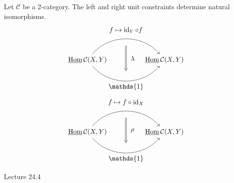 \begin{prop}
	Let $ \mathcal{ C } $ be a 2-category. 
	The left and right unit constraints determine natural isomorphisms.
	\[
	\begin{tikzcd}
		\twoHom{ \mathcal{ C } } ( X , Y )
		\arrow[bend left=50]{rr}[name=U',label=above:$ f \mapsto \id_Y \circ f $]{}
		\arrow[bend right=50]{rr}[name=D',label=below:$ \mathds{ 1 } $]{}
		&&
		\twoHom{ \mathcal{ C } } ( X , Y )
		\arrow[shorten <=10pt,shorten >=10pt,Rightarrow,to path={(U')-- node[label=right:$ \lambda $] {} (D')}]{}
	\end{tikzcd}
	\]
	\[
	\begin{tikzcd}
		\twoHom{ \mathcal{ C } } ( X , Y )
		\arrow[bend left=50]{rr}[name=U',label=above:$ f \mapsto f \circ \id_X $]{}
		\arrow[bend right=50]{rr}[name=D',label=below:$ \mathds{ 1 } $]{}
		&&
		\twoHom{ \mathcal{ C } } ( X , Y )
		\arrow[shorten <=10pt,shorten >=10pt,Rightarrow,to path={(U')-- node[label=right:$ \rho $] {} (D')}]{}
	\end{tikzcd}
	\]
\end{prop}

Lecture 24.4

